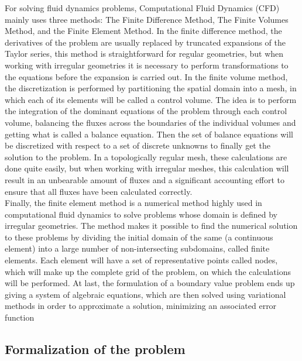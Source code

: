 \documentclass[12pt,letterpaper]{article}
\begin{document}
For solving fluid dynamics problems, Computational Fluid Dynamics (CFD) mainly uses three methods: The Finite Difference Method, The Finite Volumes Method, and the Finite Element Method. In the finite difference method, the derivatives of the problem are usually replaced by truncated expansions of the Taylor series, this method is straightforward for regular geometries, but when working with irregular geometries it is necessary to perform transformations to the equations before the expansion is carried out\cite{AutoDesk}. In the finite volume method, the discretization is performed by partitioning the spatial domain into a mesh, in which each of its elements will be called a control volume. The idea is to perform the integration of the dominant equations of the problem through each control volume, balancing the fluxes across the boundaries of the individual volumes and getting what is called a balance equation. Then the set of balance equations will be discretized with respect to a set of discrete unknowns to finally get the solution to the problem\cite{volumes}. In a topologically regular mesh, these calculations are done quite easily, but when working with irregular meshes, this calculation will result in an unbearable amount of fluxes and a significant accounting effort to ensure that all fluxes have been calculated correctly\cite{AutoDesk}.\\

Finally, the finite element method is a numerical method highly used in computational fluid dynamics to solve problems whose domain is defined by irregular geometries. The method makes it possible to find the numerical solution to these problems by dividing the initial domain of the same (a continuous element) into a large number of non-intersecting subdomains, called finite elements. Each element will have a set of representative points called nodes, which will make up the complete grid of the problem, on which the calculations will be performed. At last, the formulation of a boundary value problem ends up giving a system of algebraic equations, which are then solved using variational methods in order to approximate a solution, minimizing an associated error function\cite{element}

\subsection{Formalization of the problem}
\end{document}
